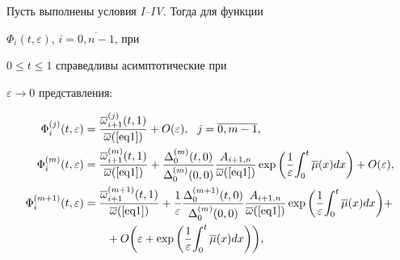 \begin{lem}


Пусть выполнены условия {\em I--IV}. Тогда для функции 


$\Phi_{i}(t,\varepsilon)$, $i=\overline{0,n-1}$,  при 


$0 \le t \le 1$ справедливы асимптотические при 


$\varepsilon \to 0$ представления\/${:}$


\begin{align*}


\Phi _{i}^{(j)} (t,\varepsilon ) &=


{\frac{{\overline {\omega} _{i + 1}^{(j)} 


(t,1)}}{{\overline {\omega} (\ref{eq1})}}}


+ O(\varepsilon ),\ \ j = \overline {0,m - 1} , \\ 


%


\Phi _{i}^{(m)} (t,\varepsilon ) &={\frac{{\overline {\omega} _{i + 1}^{(m)} 


(t,1)}}{{\overline {\omega} (\ref{eq1})}}} + {\frac{{\Delta _{0}^{(m)} 


(t,0)}}{{\Delta 


_{0}^{(m)} (0,0)}}} {\frac{{A_{i + 1,n}}} {{\overline {\omega}(\ref{eq1})}}} 


\exp \bigg( {{\frac{{1}}{{\varepsilon}} }{\int_{0}^{t} {\overline {\mu 


}(x)dx}}}  \bigg) + O(\varepsilon ), \\ 


%


\Phi _{i}^{(m + 1)} (t,\varepsilon ) &=


{\frac{{\overline {\omega} _{i + 1}^{(m + 


1)} (t,1)}}{{\overline {\omega} (\ref{eq1})}}} +


{\frac{{1}}{{\varepsilon}} } 


{\frac{{\Delta _{0}^{(m + 1)} (t,0)}}{{\Delta _{0}^{(m)} (0,0)}}} 


{\frac{{A_{i + 1,n}}} {{\overline {\omega} (\ref{eq1})}}} \exp \bigg( 


{{\frac{{1}}{{\varepsilon}} }{\int_{0}^{t} {\overline {\mu} (x)dx}}}  


\bigg) + \\ 


&\qquad + O\bigg( {\varepsilon + \exp \bigg( {{\frac{{1}}{{\varepsilon 


}}}{\int_{0}^{t} {\overline {\mu} (x)dx}}}  \bigg)} \bigg), \\ 



\end{align*}
\end{lem}
